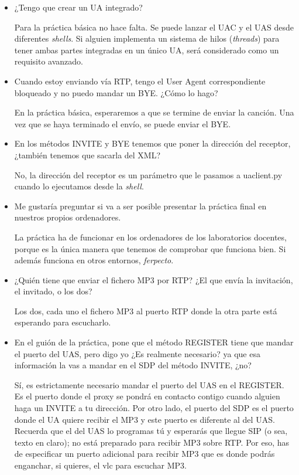 \documentclass[a4paper,11pt]{article}
\begin{document}
\begin{itemize}

\item ¿Tengo que crear un UA integrado?

Para la práctica básica no hace falta. Se puede lanzar el UAC y el UAS desde diferentes \emph{shells}. Si alguien implementa un sistema de hilos (\emph{threads}) para tener ambas partes integradas en un único UA, será considerado como un requisito avanzado.

\item Cuando estoy enviando vía RTP, tengo el User Agent correspondiente bloqueado y no puedo mandar un BYE. ¿Cómo lo hago?

En la práctica básica, esperaremos a que se termine de enviar la canción. Una vez que se haya terminado el envío, se puede enviar el BYE.

\item En los métodos INVITE y BYE tenemos que poner la dirección del receptor, ¿también tenemos que sacarla del XML?

No, la dirección del receptor es un parámetro que le pasamos a uaclient.py cuando lo ejecutamos desde la \emph{shell}.

\item Me gustaría preguntar si va a ser posible presentar la práctica final en nuestros propios ordenadores.

La práctica ha de funcionar en los ordenadores de los laboratorios docentes, porque es la única manera que tenemos de comprobar que funciona bien. Si además funciona
en otros entornos, \emph{ferpecto}.

\item ¿Quién tiene que enviar el fichero MP3 por RTP? ¿El que envía la invitación, el invitado, o los dos?

Los dos, cada uno el fichero MP3 al puerto RTP donde la otra parte está esperando para escucharlo.

\item En el guión de la práctica, pone que el
método REGISTER tiene que mandar el puerto del UAS, pero digo yo ¿Es
realmente necesario? ya que esa información la vas a mandar en el SDP
del método INVITE, ¿no?

Sí, es estrictamente necesario mandar el puerto del UAS en el REGISTER.
Es el puerto donde el proxy se pondrá en contacto contigo cuando alguien haga
un INVITE a tu dirección. Por otro lado, el puerto del SDP es el puerto donde el UA quiere recibir el MP3 y este puerto es diferente al del UAS. Recuerda que el del UAS lo programas tú y esperarás que llegue SIP (o sea, texto en claro); no está preparado para recibir MP3 sobre RTP. Por eso, has de especificar un puerto adicional para recibir MP3 que es donde podrás enganchar, si quieres, el vlc para escuchar MP3.


\end{itemize}
\end{document}
